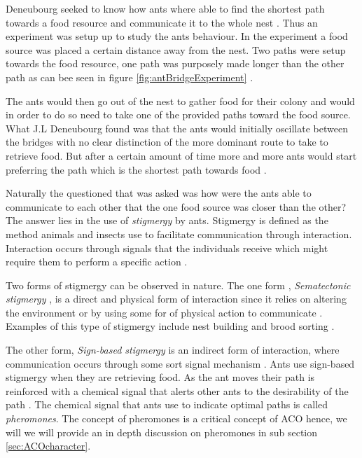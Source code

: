 Deneubourg seeked to know how ants where able to find the shortest path towards a food resource and communicate it to the whole nest \cite{AntsAndStigmergy}. Thus an experiment was setup up to study the ants behaviour. In the experiment a food source was placed a certain distance away from the nest. Two paths were setup towards the food resource, one path was purposely made longer than the other path as can bee seen in figure \ref{fig:antBridgeExperiment} \cite{AntsAndStigmergy}.

The ants would then go out of the nest to gather food for their colony and would in order to do so need to take one of the provided paths toward the food source. What J.L Deneubourg found was that the ants would initially oscillate between the bridges with no clear distinction of the more dominant route to take to retrieve food. But after a certain amount of time more and more ants would start preferring the path which is the shortest path towards food \cite{AntsAndStigmergy}.

Naturally the questioned that was asked was how were the ants able to communicate to each other that the one food source was closer than the other? The answer lies in the use of \emph{stigmergy} \label{def:stigmergy} by ants. Stigmergy is defined as the method animals and insects use to facilitate communication through interaction. Interaction occurs through signals that the individuals receive which might require them to perform a specific action \cite{AntsAndStigmergy,CompuIntelligenceIntro,AntIntroTrends}.

Two forms of stigmergy can be observed in nature. The one form , \emph{Sematectonic stigmergy} \label{def:sematectonic}, is a direct and physical form of interaction since it relies on altering the environment or by using some for of physical action to communicate \cite{CompuIntelligenceIntro}. Examples of this type of stigmergy include nest building and brood sorting \cite{CompuIntelligenceIntro}. 

The other form, \emph{Sign-based stigmergy} is an indirect form of interaction, where communication occurs through some sort signal mechanism \cite{CompuIntelligenceIntro}. Ants use sign-based stigmergy when they are retrieving food. As the ant moves their path is reinforced with a chemical signal that alerts other ants to the desirability of the path \cite{CompuIntelligenceIntro}. The chemical signal that ants use to indicate optimal paths is called \emph{pheromones}.  The concept of pheromones is a critical concept of ACO hence, we will we will provide an in depth discussion on pheromones in sub section \ref{sec:ACOcharacter}.

